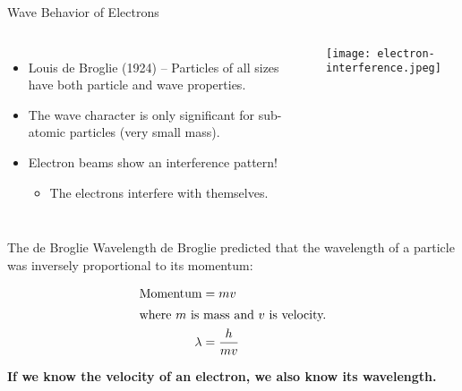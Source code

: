 \documentclass[notes=onlyslideswithnotes,notes=hide]{beamer}
\begin{document}
\begin{frame}{Wave Behavior of Electrons}
	\begin{columns}
		\begin{itemize} 
			\item Louis de Broglie (1924) -- Particles of \alert{all} sizes
				have both particle and wave properties.
			\item The wave character is only significant for sub-atomic
				particles (very small mass).
			\item Electron beams show an interference pattern!
				\begin{itemize}
					\item The electrons interfere with
						themselves.
				\end{itemize}
		\end{itemize}
		\centering
		\texttt{[image: electron-interference.jpeg]}
	\end{columns}
\end{frame}

\begin{frame}{The de Broglie Wavelength}
	de Broglie predicted that the wavelength of a particle was
	\alert{inversely proportional} to its \alert{momentum}:

	\begin{align*}
		\text{Momentum} &= mv \\
		\intertext{where $m$ is mass and $v$ is velocity.}
		\lambda &= \frac{h}{mv} \\
	\end{align*}

	\begin{center}
		\bfseries{} If we know the velocity of an electron, we also know its
		wavelength.
	\end{center}
\end{frame}
\end{document}
